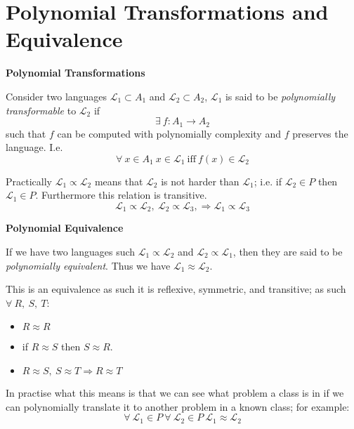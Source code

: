\section{Polynomial Transformations and Equivalence}
\textbf{Polynomial Transformations}
\begin{definition}
    Consider two languages $\mathcal{L_1} \subset A_1$ and $\mathcal{L_2} \subset A_2$,
    $\mathcal{L_1}$ is said to be \textit{polynomially transformable} to $\mathcal{L_2}$ if
    $$\exists\ f : A_1 \rightarrow A_2$$
    such that $f$ can be computed with polynomially complexity and $f$ preserves the language. I.e.
    $$\forall\ x \in A_1\ x \in \mathcal{L_1}\ \mathrm{iff}\ f(x)\in \mathcal{L_2}$$
\end{definition}

Practically $\mathcal{L_1} \propto \mathcal{L_2}$ means that
$\mathcal{L_2}$ is not harder than $\mathcal{L_1}$;
i.e. if $\mathcal{L_2} \in P$ then $\mathcal{L_1} \in P$.
Furthermore this relation is transitive.
$$
  \mathcal{L_1} \propto \mathcal{L_2},\ 
  \mathcal{L_2} \propto \mathcal{L_3},\Rightarrow
  \mathcal{L_1} \propto \mathcal{L_3}
$$

\textbf{Polynomial Equivalence}
\begin{definition}
    If we have two languages such $\mathcal{L_1} \propto \mathcal{L_2}$ and
    $\mathcal{L_2} \propto \mathcal{L_1}$, then they are said to be \textit{polynomially equivalent}.
    Thus we have $\mathcal{L_1} \approx \mathcal{L_2}$.
\end{definition}
This is an equivalence as such it is reflexive, symmetric, and transitive;
as such $\forall\ R,\ S,\ T$:
\begin{itemize}
    \item $R \approx R$
    \item if $R \approx S$ then $S \approx R$.
    \item $
        R \approx S,\ 
        S \approx T \Rightarrow
        R \approx T
        $
\end{itemize}

In practise what this means is that we can see what problem a class is in if we can
polynomially translate it to another problem in a known class; for example:
$$
  \forall\ \mathcal{L_1} \in P\ 
  \forall\ \mathcal{L_2} \in P\ 
  \mathcal{L_1} \approx \mathcal{L_2}
$$
